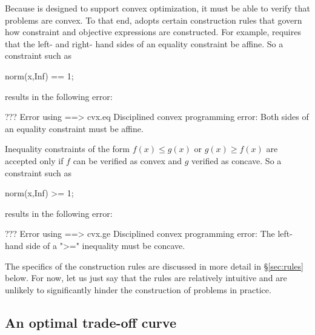 \documentclass[12pt]{article}
\begin{document}
Because \cvx is designed to support convex optimization, it must be
able to verify that problems are convex. To that end,
\cvx adopts certain construction rules
that govern how constraint and objective expressions are constructed.
For example, \cvx requires that the left- and right- hand sides of an
equality constraint be affine. So a constraint such as
\begin{code}
	norm(x,Inf) == 1;
\end{code}
results in the following error:
\begin{code}
??? Error using ==> cvx.eq
Disciplined convex programming error:
Both sides of an equality constraint must be affine.
\end{code}
Inequality constraints of the form $f(x) \leq g(x)$
or $g(x) \geq f(x)$
are accepted only if $f$ can be verified as convex and $g$
verified as concave. So a constraint such as
\begin{code}
	norm(x,Inf) >= 1;
\end{code}
results in the following error:
\begin{code}
??? Error using ==> cvx.ge
Disciplined convex programming error:
The left-hand side of a ">=" inequality must be concave.
\end{code}
The specifics of the construction rules are discussed in
more detail in \S\ref{sec:rules} below. For now, let us just
say that the rules are relatively intuitive and are unlikely
to significantly hinder the construction of problems in practice.

\subsection{An optimal trade-off curve}
\end{document}

